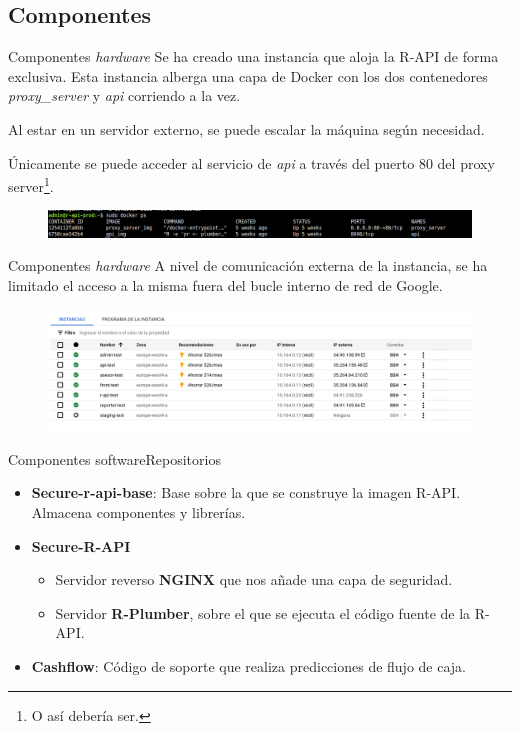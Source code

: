 \documentclass[12pt, aspectratio=169]{beamer} %
\begin{document}
\subsection{Componentes}

\begin{frame}{Componentes \textit{hardware}}
  Se ha creado una instancia que aloja la R-API de forma exclusiva. Esta instancia alberga una capa de Docker con los dos contenedores \textit{proxy\_server} y \textit{api} corriendo a la vez.

  Al estar en un servidor externo, se puede escalar la máquina según necesidad.

  Únicamente se puede acceder al servicio de \textit{api} a través del puerto 80 del proxy server\footnote{O así debería ser.}.

  \begin{figure}
    \includegraphics[width=1\textwidth]{20210407_2_docker.png}
    \label{fig:docker}
  \end{figure}

\end{frame}

\begin{frame}{Componentes \textit{hardware}}
  A nivel de comunicación externa de la instancia, se ha limitado el acceso a la misma fuera del bucle interno de red de Google.
  \begin{figure}
    \includegraphics[width=1\textwidth]{20210407_3_servers.png}
    \label{fig:servers}
  \end{figure}
\end{frame}



\begin{frame}{Componentes software}{Repositorios}

\begin{itemize}
\item \textbf{Secure-r-api-base}: Base sobre la que se construye la imagen R-API. Almacena componentes y librerías.
\item \textbf{Secure-R-API} 
  \begin{itemize}
    \item Servidor reverso \textbf{NGINX} que nos añade una capa de seguridad.
    \item Servidor \textbf{R-Plumber}, sobre el que se ejecuta el código fuente de la R-API.
  \end{itemize}
\item \textbf{Cashflow}: Código de soporte que realiza predicciones de flujo de caja.
\end{itemize}
\end{frame}
\end{document}

